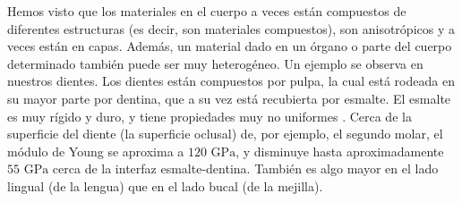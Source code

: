 \documentclass[12pt]{book}
\begin{document}
Hemos visto que los materiales en el cuerpo a veces están compuestos de diferentes estructuras (es decir, son materiales compuestos), son anisotrópicos y a veces están en capas. Además, un material dado en un órgano o parte del cuerpo determinado también puede ser muy heterogéneo. Un ejemplo se observa en nuestros dientes. Los dientes están compuestos por pulpa, la cual está rodeada en su mayor parte por dentina, que a su vez está recubierta por esmalte. El esmalte es muy rígido y duro, y tiene propiedades muy no uniformes \cite{44}. Cerca de la superficie del diente (la superficie oclusal) de, por ejemplo, el segundo molar, el módulo de Young se aproxima a $120\text{ GPa}$, y disminuye hasta aproximadamente $55\text{ GPa}$ cerca de la interfaz esmalte-dentina. También es algo mayor en el lado lingual (de la lengua) que en el lado bucal (de la mejilla).
\end{document}
